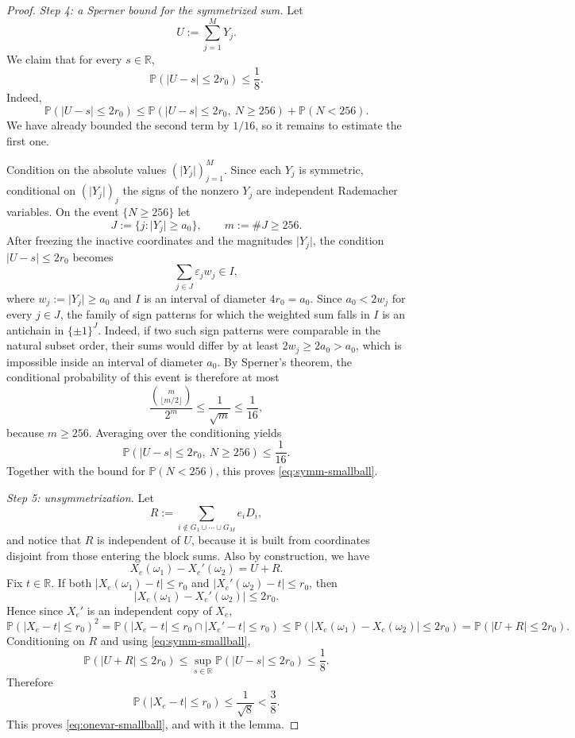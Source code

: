 \documentclass[11pt]{amsart}
\numberwithin{equation}{section}
\theoremstyle{definition}
\theoremstyle{remark}
\newcommand{\Prob}{\mathbb P}
\newcommand{\R}{\mathbb R}
\newcommand{\abs}[1]{\lvert #1 \rvert}
\begin{document}
\begin{proof}
\smallskip
\noindent\emph{Step 4: a Sperner bound for the symmetrized sum.}
Let
\[
U:=\sum_{j=1}^M Y_j.
\]
We claim that for every $s\in\R$,
\begin{equation}\label{eq:symm-smallball}
\Prob(\abs{U-s}\le 2r_0)\le \frac18.
\end{equation}
Indeed,
\[
\Prob(\abs{U-s}\le 2r_0)
\le
\Prob(\abs{U-s}\le 2r_0,\ N\ge256)+\Prob(N<256).
\]
We have already bounded the second term by $1/16$, so it remains to estimate
the first one.

Condition on the absolute values $(\abs{Y_j})_{j=1}^M$.  Since each $Y_j$ is
symmetric, conditional on $(\abs{Y_j})_j$ the signs of the nonzero $Y_j$ are
independent Rademacher variables.  On the event $\{N\ge256\}$ let
\[
J:=\{j:\abs{Y_j}\ge a_0\},
\qquad
m:=\#J\ge256.
\]
After freezing the inactive coordinates and the magnitudes $\abs{Y_j}$, the
condition $\abs{U-s}\le 2r_0$ becomes
\[
\sum_{j\in J}\varepsilon_j w_j \in I,
\]
where $w_j:=\abs{Y_j}\ge a_0$ and $I$ is an interval of diameter
$4r_0=a_0$.  Since $a_0<2w_j$ for every $j\in J$, the family of sign patterns
for which the weighted sum falls in $I$ is an antichain in $\{\pm1\}^J$.
Indeed, if two such sign patterns were comparable in the natural subset order,
their sums would differ by at least $2w_j\ge2a_0>a_0$, which is impossible
inside an interval of diameter $a_0$.  By Sperner's theorem, the conditional
probability of this event is therefore at most
\[
\frac{\binom{m}{\lfloor m/2\rfloor}}{2^m}
\le \frac1{\sqrt m}
\le \frac1{16},
\]
because $m\ge256$.  Averaging over the conditioning yields
\[
\Prob(\abs{U-s}\le 2r_0,\ N\ge256)\le \frac1{16}.
\]
Together with the bound for $\Prob(N<256)$, this proves
\eqref{eq:symm-smallball}.

\smallskip
\noindent\emph{Step 5: unsymmetrization.}
Let
\[
R:=\sum_{i\notin G_1\cup\cdots\cup G_M} e_iD_i,
\]
and notice that $R$ is independent of $U$, because it is built from coordinates disjoint
from those entering the block sums.  Also by construction, we have
\[
X_e(\omega_1)-X_e'(\omega_2)=U+R.
\]
Fix $t\in\R$.  If both $\abs{X_e(\omega_1)-t}\le r_0$ and
$\abs{X_e'(\omega_2)-t}\le r_0$, then
\[
\abs{X_e(\omega_1)-X_e'(\omega_2)}\le 2r_0.
\]
Hence since $X_{e}'$ is an independent copy of $X_e$,
\[
\Prob(\abs{X_e-t}\le r_0)^2 = \Prob(\abs{X_e-t}\le r_0\cap\abs{X_e'-t}\le r_0)
\le
\Prob(\abs{X_e(\omega_1)-X_e(\omega_2)}\le 2r_0)
=
\Prob(\abs{U+R}\le 2r_0).
\]
Conditioning on $R$ and using \eqref{eq:symm-smallball},
\[
\Prob(\abs{U+R}\le 2r_0)
\le
\sup_{s\in\R}\Prob(\abs{U-s}\le 2r_0)
\le \frac18.
\]
Therefore
\[
\Prob(\abs{X_e-t}\le r_0)\le \frac1{\sqrt8}<\frac38.
\]
This proves \eqref{eq:onevar-smallball}, and with it the lemma.
\end{proof}
\end{document}
